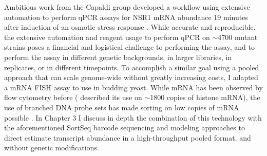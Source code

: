 Ambitious work from the
Capaldi group developed a workflow using extensive automation to
perform qPCR assays for NSR1 mRNA abundance 19 minutes after induction
of an osmotic stress response 
\parencite{worley2016genome}. While accurate and
reproducible, the extensive automation and reagent usage to perform
qPCR on $\sim$4700 mutant strains poses a financial and logistical
challenge to performing the assay, and to perform the assay in
different genetic backgrounds, in larger libraries, in replicates, or
in different timepoints.  
To accomplish a similar goal using a pooled approach that can scale
genome-wide without greatly increasing costs, I adapted a mRNA
FISH assay to use in budding yeast.
While mRNA has been observed by flow cytometry before
(\cite{yu1992sensitive} described its use on $\sim$1800 copies of
histone mRNA), the use of branched DNA probe sets has made sorting
on low copies of mRNA possible \parencite{hanley2013detection}. 
In Chapter 3 I discuss in depth the combination of this technology
with the aforementioned SortSeq barcode sequencing and modeling
approaches to direct estimate transcript abundance in a 
high-throughput pooled format, and without genetic modifications.

